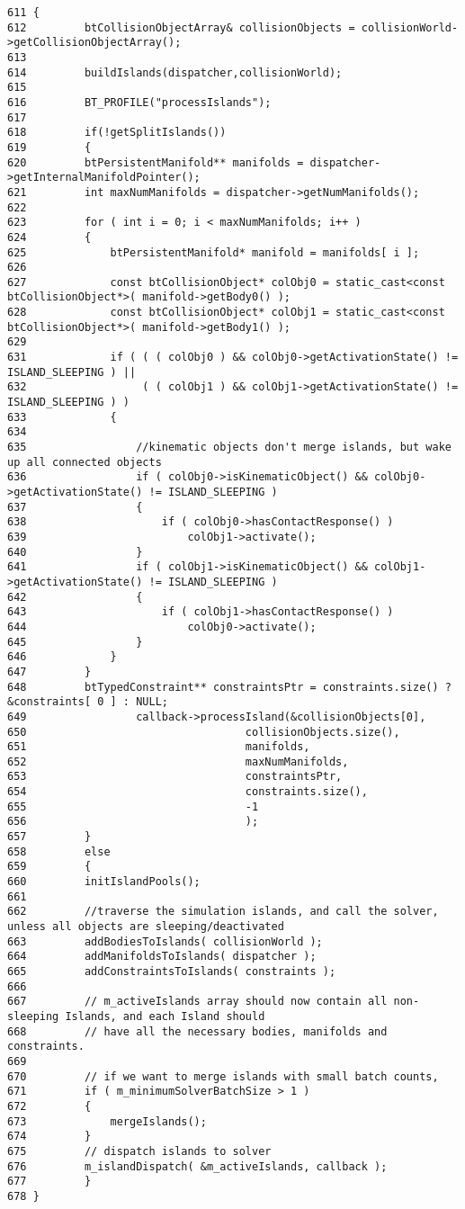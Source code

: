\begin{Code}\begin{verbatim}611 {
612         btCollisionObjectArray& collisionObjects = collisionWorld->getCollisionObjectArray();
613 
614         buildIslands(dispatcher,collisionWorld);
615 
616         BT_PROFILE("processIslands");
617 
618         if(!getSplitIslands())
619         {
620         btPersistentManifold** manifolds = dispatcher->getInternalManifoldPointer();
621         int maxNumManifolds = dispatcher->getNumManifolds();
622 
623         for ( int i = 0; i < maxNumManifolds; i++ )
624         {
625             btPersistentManifold* manifold = manifolds[ i ];
626 
627             const btCollisionObject* colObj0 = static_cast<const btCollisionObject*>( manifold->getBody0() );
628             const btCollisionObject* colObj1 = static_cast<const btCollisionObject*>( manifold->getBody1() );
629 
631             if ( ( ( colObj0 ) && colObj0->getActivationState() != ISLAND_SLEEPING ) ||
632                  ( ( colObj1 ) && colObj1->getActivationState() != ISLAND_SLEEPING ) )
633             {
634 
635                 //kinematic objects don't merge islands, but wake up all connected objects
636                 if ( colObj0->isKinematicObject() && colObj0->getActivationState() != ISLAND_SLEEPING )
637                 {
638                     if ( colObj0->hasContactResponse() )
639                         colObj1->activate();
640                 }
641                 if ( colObj1->isKinematicObject() && colObj1->getActivationState() != ISLAND_SLEEPING )
642                 {
643                     if ( colObj1->hasContactResponse() )
644                         colObj0->activate();
645                 }
646             }
647         }
648         btTypedConstraint** constraintsPtr = constraints.size() ? &constraints[ 0 ] : NULL;
649                 callback->processIsland(&collisionObjects[0],
650                                  collisionObjects.size(),
651                                  manifolds,
652                                  maxNumManifolds,
653                                  constraintsPtr,
654                                  constraints.size(),
655                                  -1
656                                  );
657         }
658         else
659         {
660         initIslandPools();
661 
662         //traverse the simulation islands, and call the solver, unless all objects are sleeping/deactivated
663         addBodiesToIslands( collisionWorld );
664         addManifoldsToIslands( dispatcher );
665         addConstraintsToIslands( constraints );
666 
667         // m_activeIslands array should now contain all non-sleeping Islands, and each Island should
668         // have all the necessary bodies, manifolds and constraints.
669 
670         // if we want to merge islands with small batch counts,
671         if ( m_minimumSolverBatchSize > 1 )
672         {
673             mergeIslands();
674         }
675         // dispatch islands to solver
676         m_islandDispatch( &m_activeIslands, callback );
677         }
678 }
\end{verbatim}
\end{Code}




